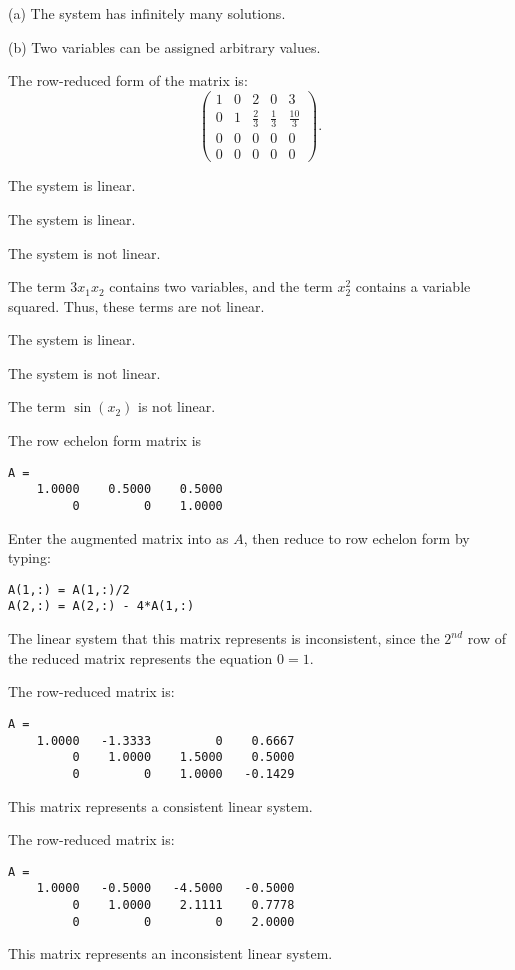 \documentclass{ximera}
\begin{document}
\ans (a) The system has infinitely many solutions.

(b) Two variables can be assigned arbitrary values.

\soln The row-reduced form of the matrix is:
\[
\left(\begin{array}{rrrr|r} 1 & 0 & 2 & 0 & 3 \\ 0 & 1 & \frac{2}{3}
& \frac{1}{3} & \frac{10}{3} \\ 0 & 0 & 0 & 0 & 0 \\ 0 & 0 & 0 & 0 & 0
\end{array}\right).
\]

\newpage
{} \ans The system is linear.

 \ans The system is linear.

 \ans The system is not linear.

\soln The term $3x_1x_2$ contains two variables, and the term $x_2^2$
contains a variable squared.  Thus, these terms are not linear.

 \ans The system is linear.

 \ans The system is not linear.

\soln The term $\sin(x_2)$ is not linear.


 \ans The row echelon form matrix is
\begin{verbatim}
A = 
    1.0000    0.5000    0.5000
         0         0    1.0000
\end{verbatim}
\soln Enter the augmented matrix into \Matlab as $A$, then reduce to
row echelon form by typing:
\begin{verbatim}
A(1,:) = A(1,:)/2
A(2,:) = A(2,:) - 4*A(1,:)
\end{verbatim}
The linear system that this matrix represents is inconsistent, since
the $2^{nd}$ row of the reduced matrix represents the equation $0 = 1$.

 The row-reduced matrix is:
\begin{verbatim}
A =
    1.0000   -1.3333         0    0.6667
         0    1.0000    1.5000    0.5000
         0         0    1.0000   -0.1429
\end{verbatim}
This matrix represents a consistent linear system.

 The row-reduced matrix is:
\begin{verbatim}
A =
    1.0000   -0.5000   -4.5000   -0.5000
         0    1.0000    2.1111    0.7778
         0         0         0    2.0000
\end{verbatim}
This matrix represents an inconsistent linear system.
\end{document}
